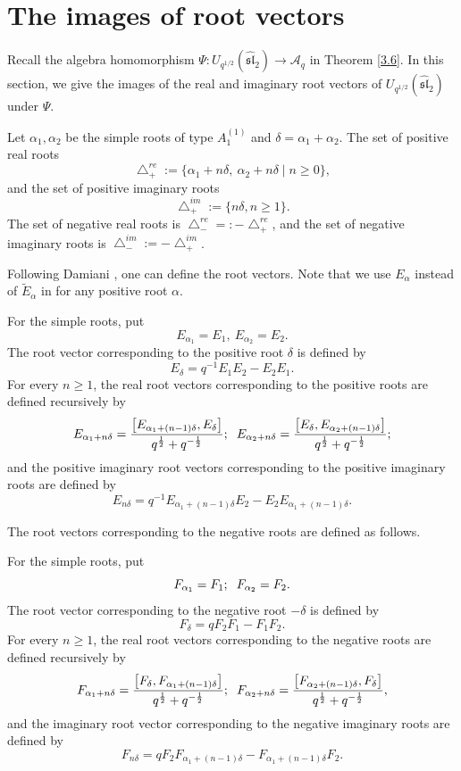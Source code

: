 \documentclass[reqno,11pt]{amsart}
\numberwithin{equation}{section}
\begin{document}
\section{The images of root vectors}

Recall the algebra homomorphism $\Psi: U_{q^{1/2}}(\widehat{\mathfrak{s l}}_2) \longrightarrow \mathcal{A}_q$ in Theorem \ref{3.6}. In this section, we give the images of the real and imaginary root vectors of $U_{q^{1/2}}(\widehat{\mathfrak{s l}}_2)$ under $\Psi$.

Let $\alpha_1, \alpha_2$ be the simple roots of type $A_1^{(1)}$ and  $\delta=\alpha_1+\alpha_2$. The set of positive real roots
 $$\bigtriangleup_{+}^{re}:=\{\alpha_1+n \delta,\ \alpha_2+n \delta \mid n \geq 0\},$$ and the set of  positive imaginary roots  $$\bigtriangleup_{+}^{im}:=\{n \delta, n \geq 1\}.$$
 The set of negative real roots is $\bigtriangleup_{-}^{re}=:-\bigtriangleup_{+}^{re}$, and the set of  negative imaginary roots is $\bigtriangleup_{-}^{im}:=-\bigtriangleup_{+}^{im}$.

 Following  Damiani \cite{Da93}, one can define the root vectors. Note that we use  $E_{\alpha}$ instead of $\widetilde{E}_{\alpha}$ in \cite{Da93} for any positive  root $\alpha$.


For the simple roots,	put $$E_{\alpha_1}=E_1,\ E_{\alpha_2}=E_2.$$
The root vector corresponding to the positive root $\delta$ is defined by
$$E_\delta=q^{-1} E_1 E_2-E_2 E_1.$$
For every $n \geq 1$,  the real root vectors corresponding to the positive
roots are defined recursively by
$$E_{\alpha_1+n \delta}=\frac{\left[E_{\alpha_1+(n-1) \delta}, E_\delta\right]}{q^{\frac{1}{2}}+q^{-\frac{1}{2}}};\hspace{0.2cm}  E_{\alpha_2+n \delta}=\frac{\left[E_\delta, E_{\alpha_2+(n-1) \delta}\right]}{q^{\frac{1}{2}}+q^{-\frac{1}{2}}};$$
and the positive imaginary root vectors corresponding to the positive imaginary roots are defined by
$$E_{n \delta}=q^{-1} E_{\alpha_1+(n-1) \delta} E_2-E_2 E_{\alpha_1+(n-1) \delta}.$$



The root vectors corresponding to the negative roots are defined as follows.

For the simple roots,	put $$F_{\alpha_1}=F_1;\hspace{0.2cm}  F_{\alpha_2}=F_2.$$
The root vector corresponding to the negative root $-\delta$ is defined by
$$F_\delta=q F_2 F_1-F_1 F_2.$$
For every $n \geq 1$,  the real root vectors corresponding to the negative
roots are defined recursively by
$$F_{\alpha_1+n \delta}=\frac{\left[F_\delta, F_{\alpha_1+(n-1) \delta}\right]}{q^{\frac{1}{2}}+q^{-\frac{1}{2}}};\hspace{0.2cm}  F_{\alpha_2+n \delta}=\frac{\left[F_{\alpha_2+(n-1) \delta}, F_\delta\right]}{q^{\frac{1}{2}}+q^{-\frac{1}{2}}},$$
and the  imaginary root vector corresponding to the negative imaginary roots  are defined by
$$F_{n \delta}=q F_2 F_{\alpha_1+(n-1) \delta}-F_{\alpha_1+(n-1) \delta} F_2.$$
\end{document}
